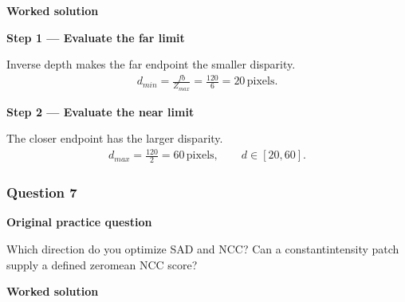 \documentclass[letterpaper,11pt,english,openany,oneside]{jupyterBook}
\begin{document}
\par\medskip
\textbf{Worked solution}\par\smallskip

\par\medskip{}
{\color{QuizStepRed}\bfseries Step 1 — Evaluate the far limit}\par\smallskip

\sphinxAtStartPar
{} Inverse depth makes the far endpoint the smaller disparity.
{\color{QuizMathBlue} \begin{equation*}
\begin{split}
d_{min}=\frac{fb}{Z_{max}}=\frac{120}{6}=20\,\mathrm{pixels}.
\end{split}
\end{equation*}}
\par

\par\medskip{}
{\color{QuizStepRed}\bfseries Step 2 — Evaluate the near limit}\par\smallskip

\sphinxAtStartPar
{} The closer endpoint has the larger disparity.
{\color{QuizMathBlue} \begin{equation*}
\begin{split}
d_{max}=\frac{120}{2}=60\,\mathrm{pixels},\qquad d\in[20,60].
\end{split}
\end{equation*}}
\par

\par\medskip


\subsubsection{Question 7}
\label{\detokenize{lectures/lecture04/tldr:question-7}}\label{\detokenize{lectures/lecture04/tldr:lec04-tldr-q7}}
\par\medskip\textbf{Original practice question}\par\smallskip

\sphinxAtStartPar
Which direction do you optimize SAD and NCC? Can a constant\sphinxhyphen{}intensity patch supply a defined zero\sphinxhyphen{}mean NCC score?

\par\medskip

\par\medskip
\textbf{Worked solution}\par\smallskip
\end{document}
